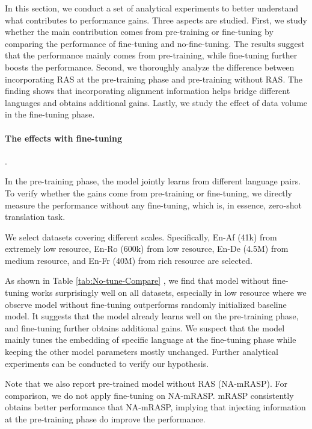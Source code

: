 \documentclass[11pt,a4paper]{article}
\newcommand{\method}{mRASP\xspace}
\begin{document}
In this section, we conduct a set of analytical experiments to better understand what contributes to performance gains. Three aspects are studied. 
First, we study whether the main contribution comes from pre-training or fine-tuning by comparing the performance of fine-tuning and no-fine-tuning. The results suggest that the performance mainly comes from pre-training, while fine-tuning further boosts the performance. Second, we thoroughly analyze the difference between incorporating RAS at the pre-training phase and pre-training without RAS. The finding shows that incorporating alignment information helps bridge different languages and obtains additional gains.
Lastly, we study the effect of data volume in the fine-tuning phase.


\paragraph{The effects with fine-tuning}.

In the pre-training phase, the model jointly learns from different language pairs. 
To verify whether the gains come from pre-training or fine-tuning, we directly measure the performance without any fine-tuning, which is, in essence, zero-shot translation task. 

We select datasets covering different scales. Specifically, En-Af (41k) from extremely low resource, En-Ro (600k) from low resource, En-De (4.5M) from medium resource, and En-Fr (40M) from rich resource are selected.

As shown in Table \ref{tab:No-tune-Compare} , we find that model without fine-tuning works surprisingly well on all datasets, especially in low resource where we observe model without fine-tuning outperforms randomly initialized baseline model. It suggests that the model already learns well on the pre-training phase, and fine-tuning further obtains additional gains. We suspect that the model mainly tunes the embedding of specific language at the fine-tuning phase while keeping the other model parameters mostly unchanged. Further analytical experiments can be conducted to verify our hypothesis. 

Note that we also report pre-trained model without RAS (NA-\method). For comparison, we do not apply fine-tuning on NA-\method. \method consistently obtains better performance that NA-\method, implying that injecting information at the pre-training phase do improve the performance.
\end{document}
